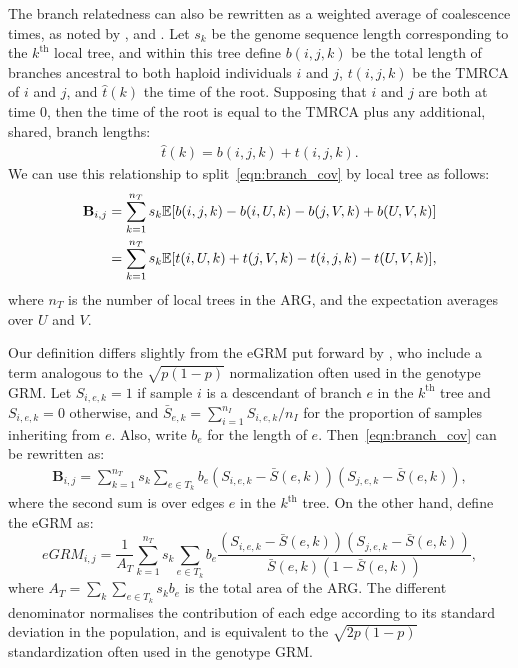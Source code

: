 The branch relatedness can also be rewritten as a weighted average of coalescence times,
as noted by \citet{mcvean2009genealogical, fan2022genealogical}, and \citet{zhang2023biobank}.
%
Let $s_k$ be the genome sequence length corresponding to the $k^\text{th}$ local tree,
and within this tree define
$b(i,j,k)$ be the total length of branches ancestral to both haploid individuals $i$ and $j$, $t(i,j,k)$
be the TMRCA of $i$ and $j$, and $\hat{t}(k)$ the time of the root.
%
Supposing that $i$ and $j$ are both at time 0,
then the time of the root is equal to the TMRCA plus any additional, shared, branch lengths:
%
\begin{align} \label{eqn:branch_relations}
    \hat{t}(k) = b(i,j,k) + t(i,j,k) .
\end{align}
%
We can use this relationship to split~\eqref{eqn:branch_cov} by local tree as follows:
%
\begin{align}
    \mathbf{B}_{i,j}
        & = \sum_{k = 1}^{n_T} s_k \mathbb{E}[b(i,j,k) - b(i,U,k) - b(j,V,k) + b(U,V,k)] \\
        & = \sum_{k = 1}^{n_T} s_k \mathbb{E}[t(i,U,k) + t(j,V,k) - t(i,j,k) - t(U,V,k)],
\end{align}
%
where $n_T$ is the number of local trees in the ARG, %
and the expectation averages over $U$ and $V$.

Our definition differs slightly from the eGRM put forward by \citet{fan2022genealogical},
who include a term analogous to the $\sqrt{p(1-p)}$ normalization
often used in the genotype GRM.
%
Let $S_{i,e,k} = 1$ if sample $i$ is a descendant of branch $e$
in the $k^\text{th}$ tree and $S_{i,e,k} = 0$ otherwise,
and $\bar{S}_{e,k} = \sum_{i=1}^{n_I} S_{i,e,k} / n_I$
for the proportion of samples inheriting from $e$.
Also, write $b_e$ for the length of $e$.
%
Then~\eqref{eqn:branch_cov} can be rewritten as:
\begin{align*}
    \mathbf{B}_{i,j}
    = \sum_{k=1}^{n_T} s_k \sum_{e \in T_k} b_e (S_{i,e,k} - \bar{S}(e,k))(S_{j,e,k} - \bar{S}(e,k)) ,
\end{align*}
where the second sum is over edges $e$ in the $k^\text{th}$ tree.
%
On the other hand, \citet{fan2022genealogical} define the eGRM as:
%
\begin{equation}
    eGRM_{i,j}
    = \frac{1}{A_T} \sum_{k=1}^{n_T} s_k \sum_{e \in T_k} b_e \frac{
        (S_{i,e,k} - \bar{S}(e,k))(S_{j,e,k} - \bar{S}(e,k)) 
        }{
        \bar{S}(e,k) (1 - \bar{S}(e,k))
        } ,
\end{equation}
where $A_T = \sum_k \sum_{e \in T_k} s_k b_e$ is the total area of the ARG.
%
The different denominator normalises the contribution of each edge according to its standard deviation in the population,
and is equivalent to the $\sqrt{2p(1-p)}$ standardization often used in the genotype GRM.

